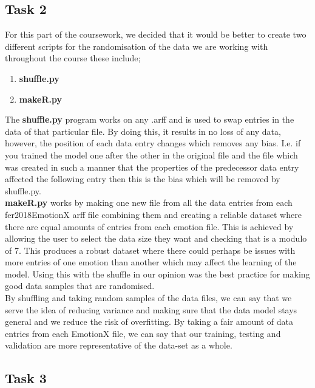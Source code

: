 \documentclass[12pt]{article}
\begin{document}
\subsection{Task 2}

For this part of the coursework, we decided that it would be better to create two different scripts for the randomisation of the data we are working with throughout the course these include;

\begin{enumerate}
	\item \textbf{shuffle.py}
	\item \textbf{makeR.py}
\end{enumerate}

The \textbf{shuffle.py} program works on any .arff and is used to swap entries in the data of that particular file. By doing this, it results in no loss of any data, however, the position of each data entry changes which removes any bias. I.e. if you trained the model one after the other in the original file and the file which was created in such a manner that the properties of the predecessor data entry affected the following entry then this is the bias which will be removed by shuffle.py.\\

\textbf{makeR.py} works by making one new file from all the data entries from each fer2018EmotionX arff file combining them and creating a reliable dataset where there are equal amounts of entries from each emotion file. This is achieved by allowing the user to select the data size they want and checking that is a modulo of 7. This produces a robust dataset where there could perhaps be issues with more entries of one emotion than another which may affect the learning of the model. Using this with the shuffle in our opinion was the best practice for making good data samples that are randomised.\\

By shuffling and taking random samples of the data files, we can say that we serve the idea of reducing variance and making sure that the data model stays general and we reduce the risk of overfitting. By taking a fair amount of data entries from each EmotionX file, we can say that our training, testing and validation are more representative of the data-set as a whole.\\

\subsection{Task 3}
\end{document}
